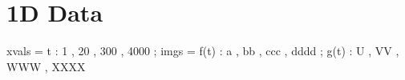 \documentclass[12pt]{article}
\begin{document}


\section{1D Data}

\begin{functable}
    xvals =    t : 1 , 20 , 300 , 4000 ;
    imgs  = f(t) : a , bb , ccc , dddd ;
            g(t) : U , VV , WWW , XXXX
\end{functable}


\end{document}
